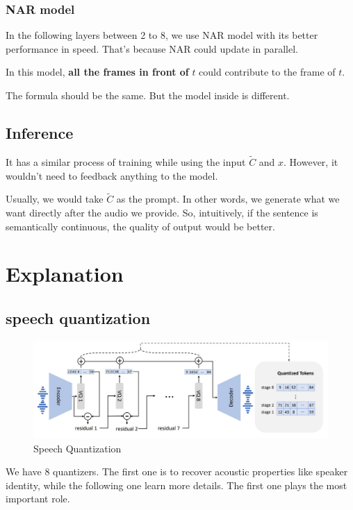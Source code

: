 \documentclass{article}
\begin{document}
\subsubsection{NAR model}
In the following layers between 2 to 8, we use NAR model with its better performance in speed. That's because NAR could update in parallel. 

In this model, \textbf{all the frames in front of} $t$ could contribute to the frame of $t$. 

The formula should be the same. But the model inside is different. 

\subsection{Inference}
It has a similar process of training while using the input $\tilde C$ and $x$. However, it wouldn't need to feedback anything to the model. 

Usually, we would take $\tilde C$ as the prompt. In other words, we generate what we want directly after the audio we provide. So, intuitively, if the sentence is semantically continuous, the quality of output would be better. 

\section{Explanation}

\subsection{speech quantization}
\begin{figure}[h]
    \centering
    \includegraphics[width=1\linewidth]{Speech Quantization.png}
    \caption{Speech Quantization}
\end{figure}

We have 8 quantizers. The first one is to recover acoustic properties like speaker identity, while the following one learn more details. The first one plays the most important role. 
\end{document}
